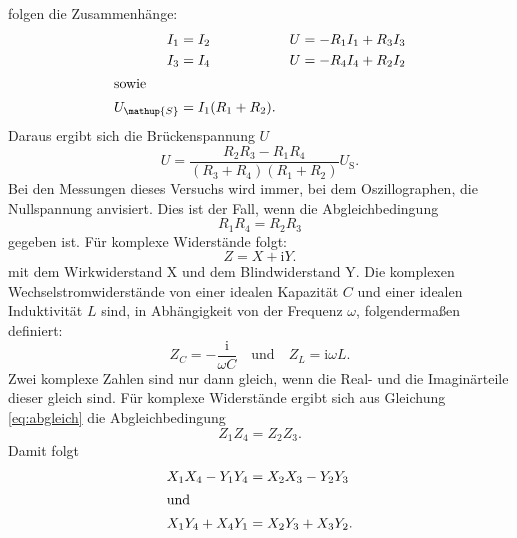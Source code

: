 \documentclass[
  bibliography=totoc,     %
  captions=tableheading,  %
  titlepage=firstiscover, %
]{scrartcl}
\begin{document}
folgen die Zusammenhänge:
\begin{align*}
    I_1 &= I_2 & U &= -R_1 I_1 + R_3 I_3\\
    I_3 &= I_4 & U &= -R_4 I_4 + R_2 I_2 \\
    \shortintertext{sowie}
    U_{\mathup{S}} &= I_1 (R_1 + R_2).
\end{align*}
Daraus ergibt sich die Brückenspannung $U$
\begin{equation}
    U = \frac{R_2 R_3 - R_1 R_4}{(R_3 + R_4)(R_1 + R_2)} U_{\mathup{S}}.
    \label{eq:brückenspannung}
\end{equation}
Bei den Messungen dieses Versuchs wird immer, bei dem Oszillographen, die
Nullspannung anvisiert. Dies ist der Fall, wenn die Abgleichbedingung
\begin{equation}
    R_1 R_4 = R_2 R_3
    \label{eq:abgleich}
\end{equation}
gegeben ist. Für komplexe Widerstände folgt:
\begin{equation}
    Z = X + \mathup{i}Y.
\end{equation}
mit dem Wirkwiderstand X und dem Blindwiderstand Y. Die komplexen
Wechselstromwiderstände von einer idealen Kapazität $C$ und einer idealen
Induktivität $L$ sind, in Abhängigkeit von der Frequenz $\omega$, folgendermaßen
definiert:
\begin{equation}
    Z_C = -\frac{\mathup{i}}{\omega C} \quad \mathup{und} \quad Z_L = \mathup{i} \omega L.
    \label{eq:impedanzen}
\end{equation}
Zwei komplexe Zahlen sind nur dann gleich, wenn die Real- und die Imaginärteile
dieser gleich sind. Für komplexe Widerstände ergibt sich aus Gleichung
\ref{eq:abgleich} die Abgleichbedingung
\begin{equation}
    \label{eq:abgleich_komplex}
    Z_1 Z_4 = Z_2 Z_3.
\end{equation}
Damit folgt
\begin{align}
    \label{eq:abgleich_komplex_1}
    X_1 X_4 - Y_1 Y_4 &= X_2 X_3 - Y_2 Y_3 \\
    \shortintertext{und}
    \label{eq:abgleich_komplex_2}
    X_1 Y_4 + X_4 Y_1 &= X_2 Y_3 + X_3 Y_2.
\end{align}
\newpage
\end{document}

